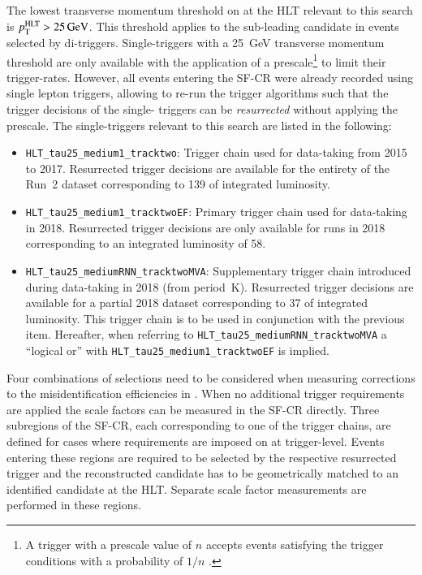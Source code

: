The lowest transverse momentum threshold on \tauhadvis at the HLT
relevant to this search is $p_{\text{T}}^{\text{HLT}} > \SI{25}{\ensuremath{\text{GeV}}}$. This threshold
applies to the sub-leading \tauhadvis candidate in events selected by
di-\tauhadvis triggers. Single-\tauhadvis triggers with a
\SI{25}{\GeV} transverse momentum threshold are only available with
the application of a prescale\footnote{A trigger with a prescale value
  of $n$ accepts events satisfying the trigger conditions with a
  probability of $1 / n$ \cite{TRIG-2019-04}.} to limit their
trigger-rates. However, all events entering the SF-CR were already
recorded using single lepton triggers, allowing to re-run the trigger
algorithms such that the trigger decisions of the single-\tauhadvis
triggers can be \textit{resurrected} without applying the
prescale. The single-\tauhadvis triggers relevant to this search are
listed in the following:%
\begin{itemize}
\item \verb|HLT_tau25_medium1_tracktwo|: Trigger chain used for
  data-taking from 2015 to 2017. Resurrected trigger decisions are
  available for the entirety of the Run~2 dataset corresponding to
  \SI{139}{\ifb} of integrated luminosity.

\item \verb|HLT_tau25_medium1_tracktwoEF|: Primary trigger chain used
  for data-taking in 2018. Resurrected trigger decisions are only
  available for runs in 2018 corresponding to an integrated luminosity
  of \SI{58}{\ifb}.

\item \verb|HLT_tau25_mediumRNN_tracktwoMVA|: Supplementary trigger
  chain introduced during data-taking in 2018 (from
  period~K). Resurrected trigger decisions are available for a partial
  2018 dataset corresponding to \SI{37}{\ifb} of integrated
  luminosity. This trigger chain is to be used in conjunction with the
  previous item. Hereafter, when referring to
  \verb|HLT_tau25_mediumRNN_tracktwoMVA| a ``logical or'' with
  \verb|HLT_tau25_medium1_tracktwoEF| is implied.

\end{itemize}

Four combinations of \tauhadvis selections need to be considered when
measuring corrections to the \jettotauhadvis misidentification
efficiencies in \ttbar. When no additional trigger requirements are
applied the scale factors can be measured in the SF-CR directly. Three
subregions of the SF-CR, each corresponding to one of the trigger
chains, are defined for cases where requirements are imposed on
\tauhadvis at trigger-level. Events entering these regions are
required to be selected by the respective resurrected trigger and the
reconstructed \tauhadvis candidate has to be geometrically matched to
an identified \tauhadvis candidate at the HLT. Separate scale factor
measurements are performed in these regions.

